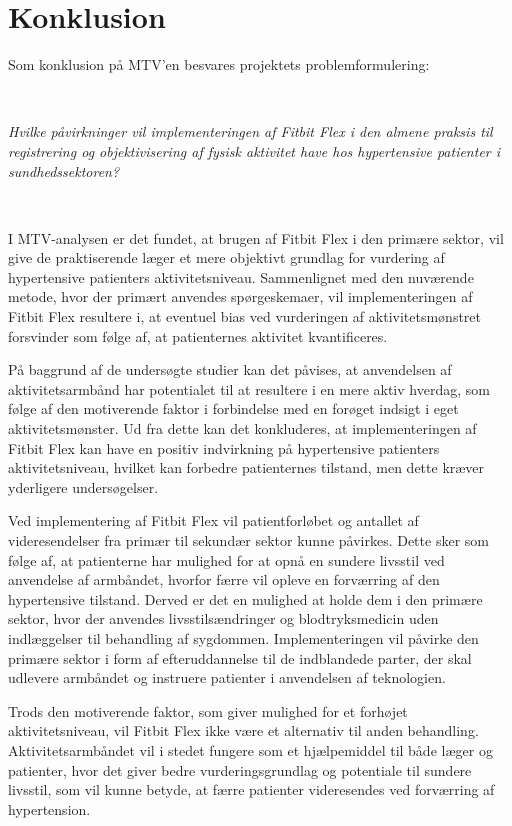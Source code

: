 \chapter{Konklusion}

Som konklusion på MTV'en besvares projektets problemformulering:

~
\begin{center}
\textit{Hvilke påvirkninger vil implementeringen af Fitbit Flex i den almene praksis til registrering og objektivisering af fysisk aktivitet have hos hypertensive patienter i sundhedssektoren?}
\end{center}
~

\noindent I MTV-analysen er det fundet, at brugen af Fitbit Flex i den primære sektor, vil give de praktiserende læger et mere objektivt grundlag for vurdering af hypertensive patienters aktivitetsniveau. Sammenlignet med den nuværende metode, hvor der primært anvendes spørgeskemaer, vil implementeringen af Fitbit Flex resultere i, at eventuel bias ved vurderingen af aktivitetsmønstret forsvinder som følge af, at patienternes aktivitet kvantificeres.

På baggrund af de undersøgte studier kan det påvises, at anvendelsen af aktivitetsarmbånd har potentialet til at resultere i en mere aktiv hverdag, som følge af den motiverende faktor i forbindelse med en forøget indsigt i eget aktivitetsmønster. Ud fra dette kan det konkluderes, at implementeringen af Fitbit Flex kan have en positiv indvirkning på hypertensive patienters aktivitetsniveau, hvilket kan forbedre patienternes tilstand, men dette kræver yderligere undersøgelser.

Ved implementering af Fitbit Flex vil patientforløbet og antallet af videresendelser fra primær til sekundær sektor kunne påvirkes. Dette sker som følge af, at patienterne har mulighed for at opnå en sundere livsstil ved anvendelse af armbåndet, hvorfor færre vil opleve en forværring af den hypertensive tilstand. Derved er det en mulighed at holde dem i den primære sektor, hvor der anvendes livsstilsændringer og blodtryksmedicin uden indlæggelser til behandling af sygdommen. Implementeringen vil påvirke den primære sektor i form af efteruddannelse til de indblandede parter, der skal udlevere armbåndet og instruere patienter i anvendelsen af teknologien.

Trods den motiverende faktor, som giver mulighed for et forhøjet aktivitetsniveau, vil Fitbit Flex ikke være et alternativ til anden behandling. Aktivitetsarmbåndet vil i stedet fungere som et hjælpemiddel til både læger og patienter, hvor det giver bedre vurderingsgrundlag og potentiale til sundere livsstil, som vil kunne betyde, at færre patienter videresendes ved forværring af hypertension.
